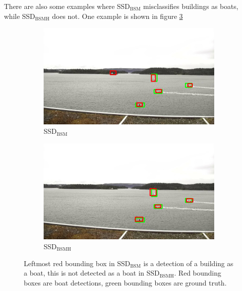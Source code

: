 There are also some examples where SSD$_{\text{BSM}}$ misclassifies buildings as boats, while SSD$_{\text{BSMH}}$ does not. One example is shown in figure \ref{img:misclass_ssd}

\begin{figure}[h!]
\begin{subfigure}{.5\textwidth}
  \centering
  \includegraphics[width=0.9\linewidth]{results/case_buildings/misclass/selected_08_07_frame11982_bbnb.jpg}
  \caption{SSD$_{\text{BSM}}$}
  \label{fig:misclass_ssd2}
\end{subfigure}%
\begin{subfigure}{.5\textwidth}
  \centering
  \includegraphics[width=.9\linewidth]{results/case_buildings/misclass/selected_08_07_frame11982_build.jpg}
  \caption{SSD$_{\text{BSMH}}$}
  \label{fig:misclass_ssd3}
\end{subfigure}
\caption{Leftmost red bounding box in SSD$_{\text{BSM}}$ is a detection of a building as a boat, this is not detected as a boat in SSD$_{\text{BSMH}}$. Red bounding boxes are boat detections, green bounding boxes are ground truth.}
\label{img:misclass_ssd}
\end{figure}

\vspace{3mm}
\newpage


